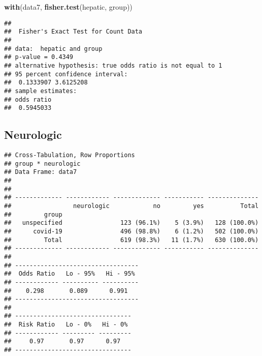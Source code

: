 \documentclass[
]{article}
\newenvironment{Shaded}{\begin{snugshade}}{\end{snugshade}}
\newcommand{\DataTypeTok}[1]{\textcolor[rgb]{0.13,0.29,0.53}{#1}}
\newcommand{\KeywordTok}[1]{\textcolor[rgb]{0.13,0.29,0.53}{\textbf{#1}}}
\newcommand{\NormalTok}[1]{#1}
\newcommand{\OperatorTok}[1]{\textcolor[rgb]{0.81,0.36,0.00}{\textbf{#1}}}
\newcommand{\OtherTok}[1]{\textcolor[rgb]{0.56,0.35,0.01}{#1}}
\newcommand{\StringTok}[1]{\textcolor[rgb]{0.31,0.60,0.02}{#1}}
\begin{document}
\begin{Shaded}
\begin{Highlighting}[]
\KeywordTok{with}\NormalTok{(data7, }\KeywordTok{fisher.test}\NormalTok{(hepatic, group))}
\end{Highlighting}
\end{Shaded}

\begin{verbatim}
## 
##  Fisher's Exact Test for Count Data
## 
## data:  hepatic and group
## p-value = 0.4349
## alternative hypothesis: true odds ratio is not equal to 1
## 95 percent confidence interval:
##  0.1333907 3.6125208
## sample estimates:
## odds ratio 
##  0.5945033
\end{verbatim}

\hypertarget{neurologic}{%
\subsection{Neurologic}\label{neurologic}}

\begin{Shaded}
\end{Shaded}

\begin{verbatim}
## Cross-Tabulation, Row Proportions  
## group * neurologic  
## Data Frame: data7  
## 
## 
## ------------- ------------ ------------- ----------- --------------
##                 neurologic            no         yes          Total
##         group                                                      
##   unspecified                123 (96.1%)    5 (3.9%)   128 (100.0%)
##      covid-19                496 (98.8%)    6 (1.2%)   502 (100.0%)
##         Total                619 (98.3%)   11 (1.7%)   630 (100.0%)
## ------------- ------------ ------------- ----------- --------------
## 
## ----------------------------------
##  Odds Ratio   Lo - 95%   Hi - 95% 
## ------------ ---------- ----------
##    0.298       0.089      0.991   
## ----------------------------------
## 
## --------------------------------
##  Risk Ratio   Lo - 0%   Hi - 0% 
## ------------ --------- ---------
##     0.97       0.97      0.97   
## --------------------------------
\end{verbatim}
\end{document}
